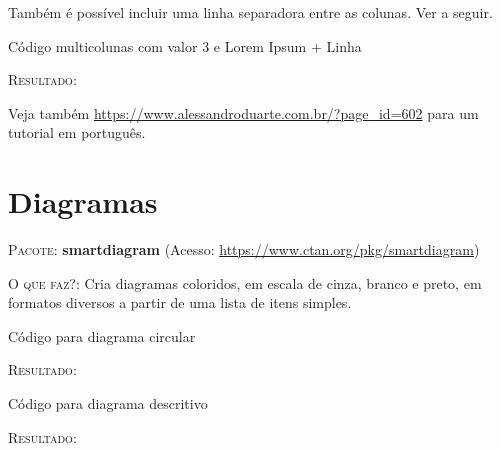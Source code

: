 \documentclass[a4paper,12pt,oneside,openright,extrafontsizes,openbib]{memoir}
\begin{document}
{Também é possível incluir uma linha separadora entre as colunas. Ver a seguir.

\begin{codex}{Código multicolunas com valor 3 e Lorem Ipsum + Linha}
	\begin{multicols}{3}
		\setlength{\columnseprule}{0.2pt}
		\lipsum[2]
	\end{multicols}
\end{codex}

\textsc{Resultado}:

\begin{multicols}{3}
	\setlength{\columnseprule}{0.2pt}
	\lipsum[2]
\end{multicols}

Veja também \url{https://www.alessandroduarte.com.br/?page_id=602} para um tutorial em português.
\chapter{Diagramas}

\textsc{Pacote:} \textbf{smartdiagram} (Acesso: \url{https://www.ctan.org/pkg/smartdiagram})

\textsc{O que faz?}: Cria diagramas coloridos, em escala de cinza, branco e preto, em formatos diversos a partir de uma lista de itens simples.

\begin{codex}{Código para diagrama circular}
	\begin{center}
	\end{center}	
\end{codex}

\textsc{Resultado}:

\begin{center}
\end{center}

\begin{codex}{Código para diagrama descritivo}
\end{codex}

\textsc{Resultado:}

}
\end{document}
